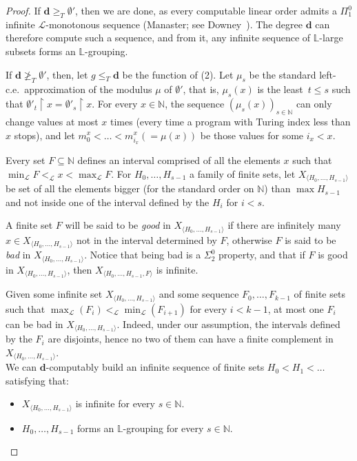 \documentclass{article}
\numberwithin{theorem}{section}
\def\LL{\mathbb{L}}
\def\L{\mathcal{L}}
\newcommand{\dbf}{\mathbf{d}}
\newcommand{\uh}{\upharpoonright}
\newcommand{\NN}[0]{\mathbb{N}}
\begin{document}
\begin{proof}
If $\dbf \geq_T \emptyset'$, then we are done, as every computable linear order admits a $\Pi^0_1$ infinite $\L$-monotonous sequence (Manaster; see Downey~\cite[Section 5]{downey1998computability}). The degree $\dbf$ can therefore compute such a sequence, and from it, any infinite sequence of $\LL$-large subsets forms an $\LL$-grouping.

If $\dbf \not \geq_T \emptyset'$, then, let $g \leq_T \dbf$ be the function of (2). Let $\mu_s$ be the standard left-c.e.\ approximation of the modulus $\mu$ of $\emptyset'$, that is, $\mu_s(x)$ is the least~$t \leq s$ such that $\emptyset'_t \uh x = \emptyset'_s \uh x$. For every $x \in \NN$, the sequence $(\mu_s(x))_{s \in \NN}$ can only change values at most $x$ times (every time a program with Turing index less than $x$ stops), and let $m^x_0 < \dots < m^x_{i_x} (= \mu(x))$ be those values for some $i_x < x$.

Every set $F \subseteq \NN$ defines an interval comprised of all the elements $x$ such that $\min_\L F <_\L x < \max_\L F$. For $H_0, \dots, H_{s - 1}$ a family of finite sets, let $X_{\langle H_0, \dots, H_{s - 1} \rangle}$ be set of all the elements bigger (for the standard order on $\NN$) than $\max H_{s-1}$ and not inside one of the interval defined by the $H_i$ for $i < s$.

A finite set $F$ will be said to be \emph{good} in $X_{\langle H_0, \dots, H_{s - 1} \rangle}$ if there are infinitely many $x \in X_{\langle H_0, \dots, H_{s - 1} \rangle}$ not in the interval determined by $F$, otherwise $F$ is said to be \emph{bad} in $X_{\langle H_0, \dots, H_{s - 1} \rangle}$. Notice that being bad is a $\Sigma_2^0$ property, and that if $F$ is good in $X_{\langle H_0, \dots, H_{s - 1} \rangle}$, then $X_{\langle H_0, \dots, H_{s - 1}, F \rangle}$ is infinite.

Given some infinite set $X_{\langle H_0, \dots, H_{s - 1} \rangle}$ and some sequence $F_0, \dots, F_{k-1}$ of finite sets such that $\max_\L(F_i) <_\L \min_\L(F_{i+1})$ for every $i < k-1$, at most one $F_i$ can be bad in $X_{\langle H_0, \dots, H_{s - 1} \rangle}$. Indeed, under our assumption, the intervals defined by the $F_i$ are disjoints, hence no two of them can have a finite complement in $X_{\langle H_0, \dots, H_{s - 1} \rangle}$. \\

We can $\dbf$-computably build an infinite sequence of finite sets $H_0 < H_1 < \dots$ satisfying that:
\begin{itemize}
    \item $X_{\langle H_0, \dots, H_{s - 1} \rangle}$ is infinite for every $s \in \NN$.
    \item $H_0, \dots, H_{s-1}$ forms an $\LL$-grouping for every $s \in \NN$.%
\end{itemize}
 

\end{proof}
\end{document}
